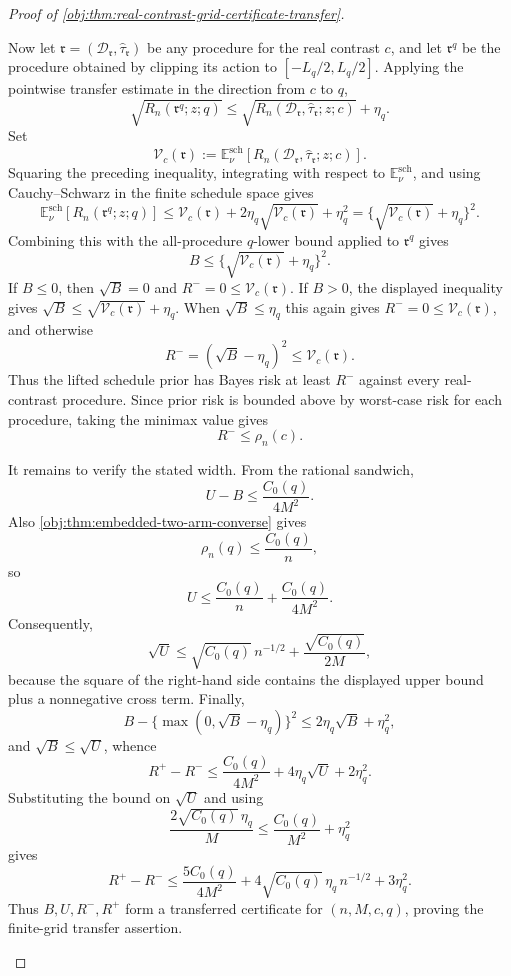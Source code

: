 \documentclass[11pt]{article}
\begin{document}
\begin{proof}[Proof of \cref{obj:thm:real-contrast-grid-certificate-transfer}]
\begin{enumerate}
Now let \(\mathfrak r=(\mathcal D_{\mathfrak r},\widehat\tau_{\mathfrak r})\) be any procedure for the real contrast \(c\), and let \(\mathfrak r^{q}\) be the procedure obtained by clipping its action to \([-L_q/2,L_q/2]\).  Applying the pointwise transfer estimate in the direction from \(c\) to \(q\),
\[
\sqrt{R_n(\mathfrak r^{q};z;q)}
\le
\sqrt{R_n(\mathcal D_{\mathfrak r},\widehat\tau_{\mathfrak r};z;c)}+\eta_q .
\]
Set
\[
\mathscr V_c(\mathfrak r)
:=
\mathbb E^{\mathrm{sch}}_{\nu}
\left[R_n(\mathcal D_{\mathfrak r},\widehat\tau_{\mathfrak r};z;c)\right].
\]
Squaring the preceding inequality, integrating with respect to \(\mathbb E^{\mathrm{sch}}_{\nu}\), and using Cauchy--Schwarz in the finite schedule space gives
\[
\mathbb E^{\mathrm{sch}}_{\nu}
\left[R_n(\mathfrak r^{q};z;q)\right]
\le
\mathscr V_c(\mathfrak r)
+2\eta_q\sqrt{\mathscr V_c(\mathfrak r)}
+\eta_q^2
=
\{\sqrt{\mathscr V_c(\mathfrak r)}+\eta_q\}^2.
\]
Combining this with the all-procedure \(q\)-lower bound applied to \(\mathfrak r^q\) gives
\[
B\le\{\sqrt{\mathscr V_c(\mathfrak r)}+\eta_q\}^2.
\]
If \(B\le0\), then \(\sqrt B=0\) and \(R^-=0\le \mathscr V_c(\mathfrak r)\).  If \(B>0\), the displayed inequality gives \(\sqrt B\le\sqrt{\mathscr V_c(\mathfrak r)}+\eta_q\).  When \(\sqrt B\le\eta_q\) this again gives \(R^-=0\le\mathscr V_c(\mathfrak r)\), and otherwise
\[
R^-=(\sqrt B-\eta_q)^2\le \mathscr V_c(\mathfrak r).
\]
Thus the lifted schedule prior has Bayes risk at least \(R^-\) against every real-contrast procedure.  Since prior risk is bounded above by worst-case risk for each procedure, taking the minimax value gives
\[
R^-\le \rho_n(c).
\]

It remains to verify the stated width.  From the rational sandwich,
\[
U-B\le \frac{C_0(q)}{4M^2}.
\]
Also \cref{obj:thm:embedded-two-arm-converse} gives
\[
\rho_n(q)\le \frac{C_0(q)}{n},
\]
so
\[
U\le \frac{C_0(q)}{n}+\frac{C_0(q)}{4M^2}.
\]
Consequently,
\[
\sqrt U
\le
\sqrt{C_0(q)}\,n^{-1/2}
+
\frac{\sqrt{C_0(q)}}{2M},
\]
because the square of the right-hand side contains the displayed upper bound plus a nonnegative cross term.  Finally,
\[
B-\{\max(0,\sqrt B-\eta_q)\}^2
\le
2\eta_q\sqrt B+\eta_q^2,
\]
and \(\sqrt B\le\sqrt U\), whence
\[
R^+-R^-
\le
\frac{C_0(q)}{4M^2}+4\eta_q\sqrt U+2\eta_q^2.
\]
Substituting the bound on \(\sqrt U\) and using
\[
\frac{2\sqrt{C_0(q)}\,\eta_q}{M}
\le
\frac{C_0(q)}{M^2}+\eta_q^2
\]
gives
\[
R^+-R^-\le
\frac{5C_0(q)}{4M^2}
+4\sqrt{C_0(q)}\,\eta_q\,n^{-1/2}
+3\eta_q^2.
\]
Thus \(B,U,R^-,R^+\) form a transferred certificate for \((n,M,c,q)\), proving the finite-grid transfer assertion. %


\end{enumerate}
\end{proof}
\end{document}
